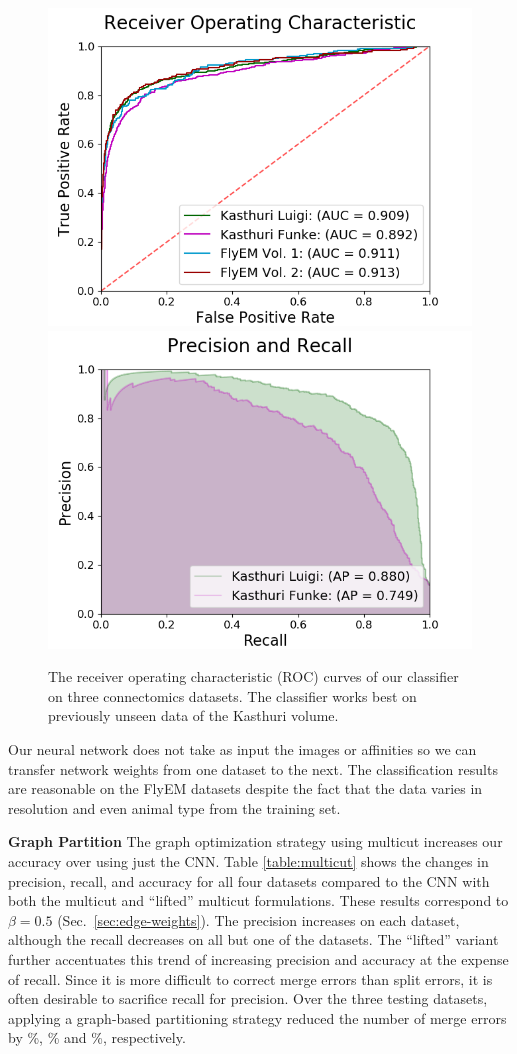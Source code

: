 \begin{figure}
	\centering
	\includegraphics[width=0.45\linewidth]{./figures/receiver-operating-characteristic.png}		\includegraphics[width=0.45\linewidth]{./figures/precision-and-recall.png}
	\caption{The receiver operating characteristic (ROC) curves of our classifier on three connectomics datasets. The classifier works best on previously unseen data of the Kasthuri volume.}
	\label{fig:receiver-operating-characteristic}
\end{figure}

Our neural network does not take as input the images or affinities so we can transfer network weights from one dataset to the next.
The classification results are reasonable on the FlyEM datasets despite the fact that the data varies in resolution and even animal type from the training set.


\noindent\textbf{Graph Partition}
The graph optimization strategy using multicut increases our accuracy over using just the CNN.
Table \ref{table:multicut} shows the changes in precision, recall, and accuracy for all four datasets compared to the CNN with both the multicut and ``lifted'' multicut formulations.
These results correspond to $\beta = 0.5$ (Sec.~\ref{sec:edge-weights}). 
The precision increases on each dataset, although the recall decreases on all but one of the datasets.
The ``lifted'' variant further accentuates this trend of increasing precision and accuracy at the expense of recall. 
Since it is more difficult to correct merge errors than split errors, it is often desirable to sacrifice recall for precision.
Over the three testing datasets, applying a graph-based partitioning strategy reduced the number of merge errors by \%, \% and \%, respectively. 

